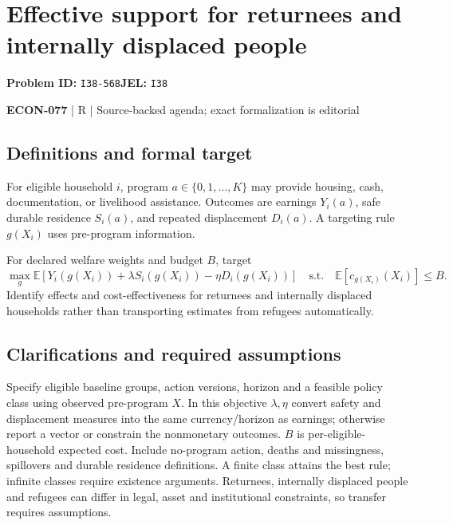 \documentclass[11pt,a4paper]{article}
\begin{document}
\section*{Effective support for returnees and internally displaced people}
\textbf{Problem ID:} \texttt{I38-568}\quad \textbf{JEL:} \texttt{I38}\par
\label{problem:OP-0643}


\label{audited:ECON-077}

{\sffamily\small\color{muted}\textbf{ECON-077} | R | Source-backed agenda; exact formalization is editorial\par}

\subsection*{Definitions and formal target}

For eligible household $i$, program $a\in\{0,1,\ldots,K\}$ may provide housing, cash, documentation, or livelihood assistance. Outcomes are earnings $Y_i(a)$, safe durable residence $S_i(a)$, and repeated displacement $D_i(a)$. A targeting rule $g(X_i)$ uses pre-program information.

For declared welfare weights and budget $B$, target
\[
 \max_g\mathbb E[Y_i(g(X_i))+\lambda S_i(g(X_i))-\eta D_i(g(X_i))]
 \quad\text{s.t.}\quad\mathbb E[c_{g(X_i)}(X_i)]\leq B.
\]
Identify effects and cost-effectiveness for returnees and internally displaced households rather than transporting estimates from refugees automatically.

\subsection*{Clarifications and required assumptions}

Specify eligible baseline groups, action versions, horizon and a feasible policy class using observed pre-program \(X\). In this objective \(\lambda,\eta\) convert safety and displacement measures into the same currency/horizon as earnings; otherwise report a vector or constrain the nonmonetary outcomes. \(B\) is per-eligible-household expected cost. Include no-program action, deaths and missingness, spillovers and durable residence definitions. A finite class attains the best rule; infinite classes require existence arguments. Returnees, internally displaced people and refugees can differ in legal, asset and institutional constraints, so transfer requires assumptions.
\end{document}
